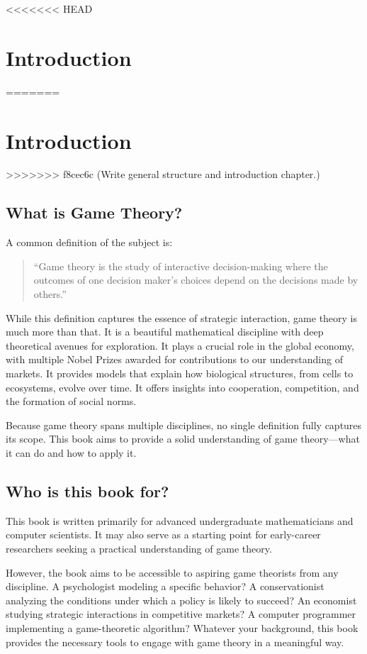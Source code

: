 <<<<<<< HEAD
\chapter{Introduction}\label{chapter:introduction}
=======
\chapter{Introduction}
\label{chapter:introduction}
>>>>>>> f8cec6c (Write general structure and introduction chapter.)

\section{What is Game Theory?}

A common definition of the subject is:

\begin{quote} 
``Game theory is the study of interactive decision-making where
the outcomes of one decision maker’s choices depend on the decisions made by
others.'' 
\end{quote}

While this definition captures the essence of strategic interaction, game theory
is much more than that. It is a beautiful mathematical discipline with deep
theoretical avenues for exploration. It plays a crucial role in the global
economy, with multiple Nobel Prizes awarded for contributions to our
understanding of markets. It provides models that explain how biological
structures, from cells to ecosystems, evolve over time. It offers insights into
cooperation, competition, and the formation of social norms.

Because game theory spans multiple disciplines, no single definition fully
captures its scope. This book aims to provide a solid understanding of game
theory—what it can do and how to apply it.

\section{Who is this book for?}

This book is written primarily for advanced undergraduate mathematicians and
computer scientists. It may also serve as a starting point for early-career
researchers seeking a practical understanding of game theory.  

However, the book aims to be accessible to aspiring game theorists from any
discipline. A psychologist modeling a specific behavior? A conservationist
analyzing the conditions under which a policy is likely to succeed? An economist
studying strategic interactions in competitive markets? A computer programmer
implementing a game-theoretic algorithm? Whatever your background, this book
provides the necessary tools to engage with game theory in a meaningful way.  

